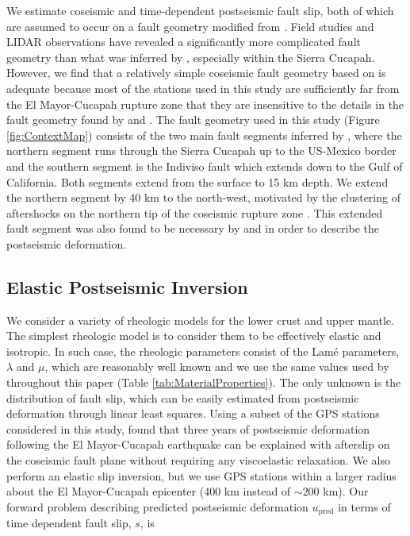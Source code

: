 \documentclass[draft,linenumbers]{AGUJournal}
\begin{document}
We estimate coseismic and time-dependent postseismic fault slip, both of which are assumed to occur on a fault geometry modified from \citet{Wei2011}.  Field studies \citep{Fletcher2014} and LIDAR observations \citep{Oskin2012} have revealed a significantly more complicated fault geometry than what was inferred by \citet{Wei2011}, especially within the Sierra Cucapah.  However, we find that a relatively simple coseismic fault geometry based on \citep{Wei2011} is adequate because most of the stations used in this study are sufficiently far from the El Mayor-Cucapah rupture zone that they are insensitive to the details in the fault geometry found by \citet{Fletcher2014} and \citet{Oskin2012}.  The fault geometry used in this study (Figure \ref{fig:ContextMap}) consists of the two main fault segments inferred by \citet{Wei2011}, where the northern segment runs through the Sierra Cucapah up to the US-Mexico border and the southern segment is the Indiviso fault which extends down to the Gulf of California. Both segments extend from the surface to 15 km depth.  We extend the northern segment by 40 km to the north-west, motivated by the clustering of aftershocks on the northern tip of the coseismic rupture zone \citep{Hauksson2011,Kroll2013}.  This extended fault segment was also found to be necessary by \citet{Rollins2015} and \citet{Pollitz2012} in order to describe the postseismic deformation. 

\subsection{Elastic Postseismic Inversion}\label{sec:ElasticInversion}    
We consider a variety of rheologic models for the lower crust and upper mantle. The simplest rheologic model is to consider them to be effectively elastic and isotropic.  In such case, the rheologic parameters consist of the Lam\'e parameters, $\lambda$ and $\mu$, which are reasonably well known and we use the same values used by \citet{Wei2011} throughout this paper (Table \ref{tab:MaterialProperties}).  The only unknown is the distribution of fault slip, which can be easily estimated from postseismic deformation through linear least squares.  Using a subset of the GPS stations considered in this study, \citet{Rollins2015} found that three years of postseismic deformation following the El Mayor-Cucapah earthquake can be explained with afterslip on the coseismic fault plane without requiring any viscoelastic relaxation. We also perform an elastic slip inversion, but we use GPS stations within a larger radius about the El Mayor-Cucapah epicenter (400 km instead of ${\sim}200$ km). Our forward problem describing predicted postseismic deformation $u_\mathrm{pred}$ in terms of time dependent fault slip, $s$, is
\end{document}
